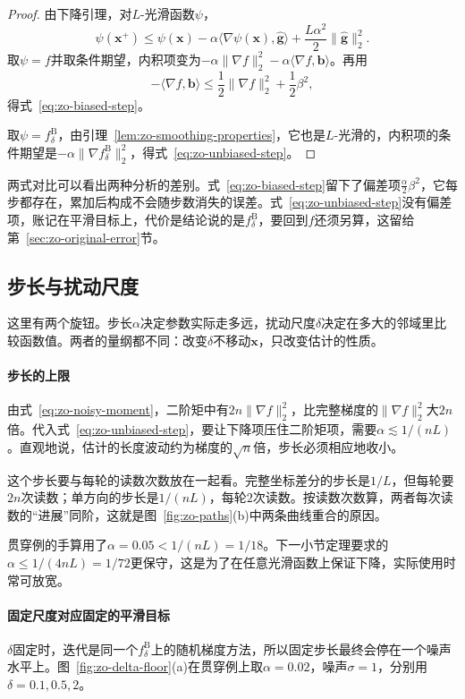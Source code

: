 \begin{proof}
由下降引理，对$L$-光滑函数$\psi$，
\[
 \psi(\bm{x}^+)\leq\psi(\bm{x})-\alpha\langle\nabla\psi(\bm{x}),\hat{\bm{g}}\rangle+\frac{L\alpha^2}{2}\lVert\hat{\bm{g}}\rVert_2^2.
\]
取$\psi=f$并取条件期望，内积项变为$-\alpha\lVert\nabla f\rVert_2^2-\alpha\langle\nabla f,\bm{b}\rangle$。再用
\[
 -\langle\nabla f,\bm{b}\rangle\leq\frac12\lVert\nabla f\rVert_2^2+\frac12\beta^2,
\]
得式~\eqref{eq:zo-biased-step}。

取$\psi=f^{\mathrm{B}}_{\delta}$，由引理~\ref{lem:zo-smoothing-properties}，它也是$L$-光滑的，内积项的条件期望是$-\alpha\lVert\nabla f^{\mathrm{B}}_{\delta}\rVert_2^2$，得式~\eqref{eq:zo-unbiased-step}。
\end{proof}

两式对比可以看出两种分析的差别。式~\eqref{eq:zo-biased-step}留下了偏差项$\tfrac{\alpha}{2}\beta^2$，它每步都存在，累加后构成不会随步数消失的误差。式~\eqref{eq:zo-unbiased-step}没有偏差项，账记在平滑目标上，代价是结论说的是$f^{\mathrm{B}}_{\delta}$，要回到$f$还须另算，这留给第~\ref{sec:zo-original-error}节。

\subsection{步长与扰动尺度}
\label{sec:zo-step-scale}

这里有两个旋钮。步长$\alpha$决定参数实际走多远，扰动尺度$\delta$决定在多大的邻域里比较函数值。两者的量纲都不同：改变$\delta$不移动$\bm{x}$，只改变估计的性质。

\paragraph{步长的上限}
由式~\eqref{eq:zo-noisy-moment}，二阶矩中有$2n\lVert\nabla f\rVert_2^2$，比完整梯度的$\lVert\nabla f\rVert_2^2$大$2n$倍。代入式~\eqref{eq:zo-unbiased-step}，要让下降项压住二阶矩项，需要$\alpha\lesssim1/(nL)$。直观地说，估计的长度波动约为梯度的$\sqrt{n}$倍，步长必须相应地收小。

这个步长要与每轮的读数次数放在一起看。完整坐标差分的步长是$1/L$，但每轮要$2n$次读数；单方向的步长是$1/(nL)$，每轮$2$次读数。按读数次数算，两者每次读数的“进展”同阶，这就是图~\ref{fig:zo-paths}(b)中两条曲线重合的原因。

贯穿例的手算用了$\alpha=0.05<1/(nL)=1/18$。下一小节定理要求的$\alpha\leq1/(4nL)=1/72$更保守，这是为了在任意光滑函数上保证下降，实际使用时常可放宽。

\paragraph{固定尺度对应固定的平滑目标}
$\delta$固定时，迭代是同一个$f^{\mathrm{B}}_{\delta}$上的随机梯度方法，所以固定步长最终会停在一个噪声水平上。图~\ref{fig:zo-delta-floor}(a)在贯穿例上取$\alpha=0.02$，噪声$\sigma=1$，分别用$\delta=0.1,0.5,2$。

